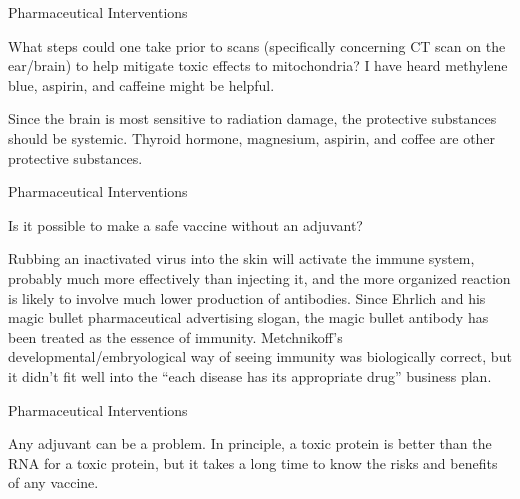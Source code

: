 \documentclass[11pt,oneside,openany,extrafontsizes]{memoir}
\begin{document}
\begin{qaexchange}{Pharmaceutical Interventions}

    \begin{question}
        What steps could one take prior to scans (specifically concerning CT scan on the ear/brain) to help mitigate toxic effects to mitochondria? I have heard methylene blue, aspirin, and caffeine might be helpful.
    \end{question}

    \begin{answer}
      Since the brain is most sensitive to radiation damage, the protective substances should be systemic. Thyroid hormone, magnesium, aspirin, and coffee are other protective substances.
    \end{answer}
\end{qaexchange}

\begin{qaexchange}{Pharmaceutical Interventions}

    \begin{question}
        Is it possible to make a safe vaccine without an adjuvant?
    \end{question}

    \begin{answer}
      Rubbing an inactivated virus into the skin will activate the immune system, probably much more effectively than injecting it, and the more organized reaction is likely to involve much lower production of antibodies. Since Ehrlich and his magic bullet pharmaceutical advertising slogan, the magic bullet antibody has been treated as the essence of immunity. Metchnikoff's developmental/embryological way of seeing immunity was biologically correct, but it didn't fit well into the \enquote{each disease has its appropriate drug} business plan.
    \end{answer}
\end{qaexchange}

\begin{standalonequote}{Pharmaceutical Interventions}

    \begin{answer}
      Any adjuvant can be a problem. In principle, a toxic protein is better than the RNA for a toxic protein, but it takes a long time to know the risks and benefits of any vaccine.
    \end{answer}
\end{standalonequote}
\end{document}
